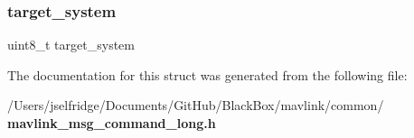 \subsubsection{target\+\_\+system}
{\footnotesize\ttfamily uint8\+\_\+t target\+\_\+system}



The documentation for this struct was generated from the following file\+:\begin{DoxyCompactItemize}
\item 
/\+Users/jselfridge/\+Documents/\+Git\+Hub/\+Black\+Box/mavlink/common/\textbf{ mavlink\+\_\+msg\+\_\+command\+\_\+long.\+h}\end{DoxyCompactItemize}
